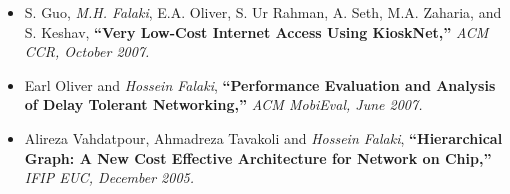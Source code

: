 \documentclass[margin]{res}
\begin{document}
\begin{resume}
\begin{itemize}
\item S. Guo, \emph{M.H. Falaki}, E.A. Oliver, S. Ur Rahman, A. Seth,
M.A. Zaharia, and S. Keshav, 
{\bf ``Very Low-Cost Internet Access Using KioskNet,''}
\emph{ACM CCR, October 2007.}

\item Earl Oliver and \emph{Hossein Falaki}, 
{\bf ``Performance Evaluation and Analysis of Delay Tolerant Networking,''} 
\emph{ACM MobiEval, June 2007.}

\item Alireza Vahdatpour, Ahmadreza Tavakoli and \emph{Hossein Falaki},
{\bf ``Hierarchical Graph: A New Cost Effective Architecture for Network on Chip,''}
\emph{IFIP EUC, December 2005.}
\end{itemize}

\end{resume}
\end{document}
